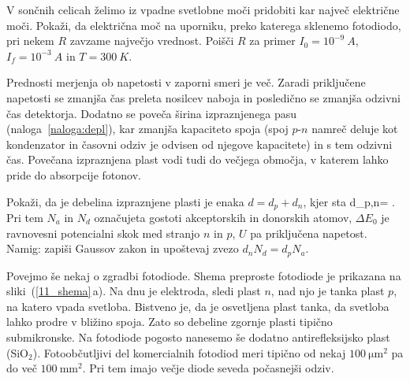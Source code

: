 \begin{definition}
\label{naloga:optR}
V sončnih celicah želimo iz vpadne svetlobne moči pridobiti kar največ električne moči.
Pokaži, da električna moč na uporniku, preko katerega sklenemo fotodiodo, pri nekem $R$
zavzame največjo vrednost. Poišči $R$ za primer $I_0 = 10^{-9}~\si{A}$, $I_f = 10^{-3}~\si{A}$ 
in $T=300~\si{K}$.
\end{definition}

Prednosti merjenja ob napetosti v zaporni smeri je več. 
Zaradi priključene napetosti se zmanjša čas preleta
nosilcev naboja in posledično se zmanjša odzivni čas detektorja.
Dodatno se poveča širina izpraznjenega pasu (naloga~\ref{naloga:depl}), kar zmanjša kapaciteto spoja 
(spoj $p$-$n$ namreč deluje kot  
kondenzator in časovni odziv je odvisen od njegove kapacitete) in s tem odzivni čas. Povečana
izpraznjena plast vodi tudi do večjega območja, v katerem lahko pride do absorpcije fotonov. 

\begin{definition}
\label{naloga:depl}
Pokaži, da je debelina izpraznjene plasti je enaka $d = d_p+d_n$, kjer sta 
\beq
d_{p,n}= .
\eeq
Pri tem $N_a$ in $N_d$ označujeta gostoti akceptorskih in donorskih atomov, $\Delta E_0$ je ravnovesni 
potencialni skok med stranjo $n$ in $p$, $U$ pa priključena napetost. \\ Namig: zapiši Gaussov zakon in 
upoštevaj zvezo $d_n N_d = d_p N_a$.
\end{definition}

Povejmo še nekaj o zgradbi fotodiode. Shema preproste fotodiode je prikazana na 
sliki~(\ref{11_shema}\,a).
Na dnu je elektroda, sledi plast $n$, nad njo je tanka plast $p$, na katero vpada svetloba.
Bistveno je, da je osvetljena plast tanka, da svetloba lahko prodre v bližino spoja. Zato so 
debeline zgornje plasti tipično submikronske. Na fotodiode pogosto nanesemo
še dodatno antirefleksijsko plast (SiO$_2$). 
Fotoobčutljivi del komercialnih fotodiod
meri tipično od nekaj $100~\si{\micro\meter}^2$ pa do več $100~\si{\milli\metre}^2$. Pri 
tem imajo večje diode seveda počasnejši odziv. 

